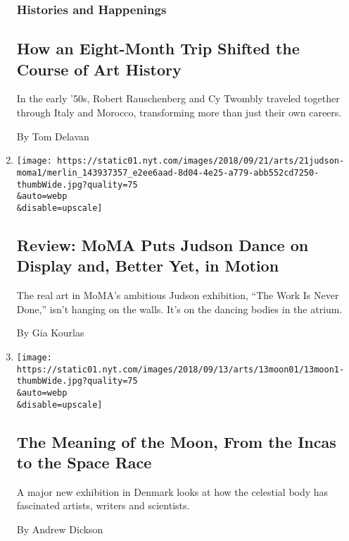 \begin{enumerate}
{  \subsubsection{Histories and
  Happenings}\label{histories-and-happenings}}

  \hypertarget{how-an-eight-month-trip-shifted-the-course-of-art-history}{%
  \subsection{How an Eight-Month Trip Shifted the Course of Art
  History}\label{how-an-eight-month-trip-shifted-the-course-of-art-history}}

  In the early '50s, Robert Rauschenberg and Cy Twombly traveled
  together through Italy and Morocco, transforming more than just their
  own careers.

  By Tom Delavan
\item
  \href{/2018/09/20/arts/dance/judson-dance-theater-the-work-is-never-done-moma-review.html}{}

  \texttt{[image: https://static01.nyt.com/images/2018/09/21/arts/21judson-moma1/merlin\_143937357\_e2ee6aad-8d04-4e25-a779-abb552cd7250-thumbWide.jpg?quality=75\\\&auto=webp\\\&disable=upscale]}

  \hypertarget{review-moma-puts-judson-dance-on-display-and-better-yet-in-motion}{%
  \subsection{Review: MoMA Puts Judson Dance on Display and, Better Yet,
  in
  Motion}\label{review-moma-puts-judson-dance-on-display-and-better-yet-in-motion}}

  The real art in MoMA's ambitious Judson exhibition, ``The Work Is
  Never Done,'' isn't hanging on the walls. It's on the dancing bodies
  in the atrium.

  By Gia Kourlas
\item
  \href{/2018/09/12/arts/design/moon-exhibition-louisiana-copenhagen.html}{}

  \texttt{[image: https://static01.nyt.com/images/2018/09/13/arts/13moon01/13moon1-thumbWide.jpg?quality=75\\\&auto=webp\\\&disable=upscale]}

  \hypertarget{the-meaning-of-the-moon-from-the-incas-to-the-space-race}{%
  \subsection{The Meaning of the Moon, From the Incas to the Space
  Race}\label{the-meaning-of-the-moon-from-the-incas-to-the-space-race}}

  A major new exhibition in Denmark looks at how the celestial body has
  fascinated artists, writers and scientists.

  By Andrew Dickson
\end{enumerate}

